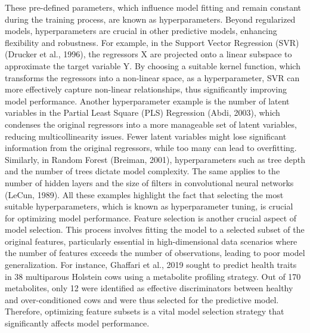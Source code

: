 These pre-defined parameters, which influence model fitting and remain constant during the training process, are known as hyperparameters. Beyond regularized models, hyperparameters are crucial in other predictive models, enhancing flexibility and robustness. For example, in the Support Vector Regression (SVR) (Drucker et al., 1996), the regressors X are projected onto a linear subspace to approximate the target variable Y. By choosing a suitable kernel function, which transforms the regressors into a non-linear space, as a hyperparameter, SVR can more effectively capture non-linear relationships, thus significantly improving model performance. Another hyperparameter example is the number of latent variables in the Partial Least Square (PLS) Regression  (Abdi, 2003), which condenses the original regressors into a more manageable set of latent variables, reducing multicollinearity issues. Fewer latent variables might lose significant information from the original regressors, while too many can lead to overfitting. Similarly, in Random Forest (Breiman, 2001), hyperparameters such as tree depth and the number of trees dictate model complexity. The same applies to the number of hidden layers and the size of filters in convolutional neural networks (LeCun, 1989). All these examples highlight the fact that selecting the most suitable hyperparameters, which is known as hyperparameter tuning, is crucial for optimizing model performance.
Feature selection is another crucial aspect of model selection. This process involves fitting the model to a selected subset of the original features, particularly essential in high-dimensional data scenarios where the number of features exceeds the number of observations, leading to poor model generalization. For instance, Ghaffari et al., 2019 sought to predict health traits in 38 multiparous Holstein cows using a metabolite profiling strategy. Out of 170 metabolites, only 12 were identified as effective discriminators between healthy and over-conditioned cows and were thus selected for the predictive model. Therefore, optimizing feature subsets is a vital model selection strategy that significantly affects model performance.
